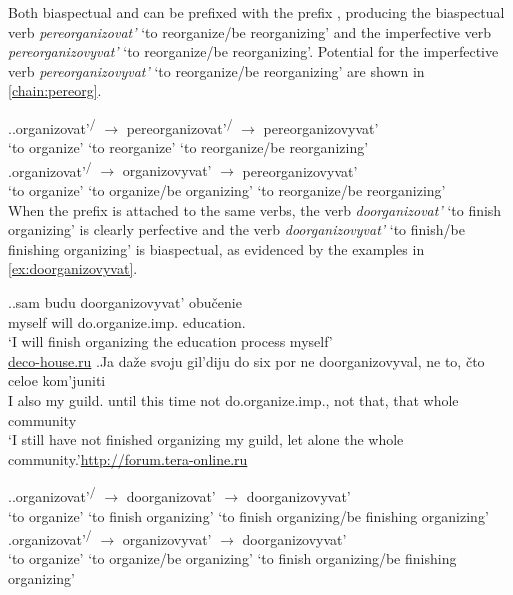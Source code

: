 Both biaspectual and  can be prefixed with the  prefix , producing the biaspectual verb \textit{pereorganizovat'} `to reorganize/be reorganizing' and the imperfective verb \textit{pereorganizovyvat'} `to reorganize/be reorganizing'. Potential  for the imperfective verb \textit{pereorganizovyvat'} `to reorganize/be reorganizing' are shown in \ref{chain:pereorg}. 

\ex.\label{chain:pereorg}\ag.organizovat'\textsuperscript{\PF\slash\IPF} {$\rightarrow$} {pereorganizovat'\textsuperscript{\PF\slash\IPF}} {$\rightarrow$} pereorganizovyvat'\textsuperscript{\IPF}\\
{`to organize'} {} {`to reorganize'} {} {`to reorganize/be reorganizing'}\\
\bg.organizovat'\textsuperscript{\PF\slash\IPF} {$\rightarrow$} {organizovyvat'\textsuperscript{\IPF}} {$\rightarrow$} pereorganizovyvat'\textsuperscript{\IPF}\\
{`to organize'} {} {`to organize/be organizing'} {} {`to reorganize/be reorganizing'}\\

When the  prefix  is attached to the same verbs, the verb \textit{doorganizovat'} `to finish organizing' is clearly perfective and the verb \textit{doorganizovyvat'} `to finish/be finishing organizing' is biaspectual, as evidenced by the examples in \ref{ex:doorganizovyvat}.

\ex.\label{ex:doorganizovyvat}\ag.sam budu doorganizovyvat'\textsuperscript{\IPF} obu\v{c}enie\\
myself will do.organize.imp. education.\\
\trans `I will finish organizing the education process myself'\\\hbox{}\hfill\hbox{\url{deco-house.ru}}
\bg.Ja da\v{z}e svoju gil'diju do six por ne doorganizovyval\textsuperscript{\PF}, ne to, \v{c}to celoe kom'juniti\\
I also my guild. until this time not do.organize.imp., not that, that whole community\\
\trans `I still have not finished organizing my guild, let alone the whole community.'\hbox{}\hfill\hbox{\url{http://forum.tera-online.ru}}

\ex.\label{chain:doorg}\ag.organizovat'\textsuperscript{\PF\slash\IPF} {$\rightarrow$} {doorganizovat'\textsuperscript{\PF}} {$\rightarrow$} doorganizovyvat'\textsuperscript{\IPF}\\
{`to organize'} {} {`to finish organizing'} {} {`to finish organizing/be finishing organizing'}\\
\bg.organizovat'\textsuperscript{\PF\slash\IPF} {$\rightarrow$} {organizovyvat'\textsuperscript{\IPF}} {$\rightarrow$} doorganizovyvat'\textsuperscript{\PF}\\
{`to organize'} {} {`to organize/be organizing'} {} {`to finish organizing/be finishing organizing'}\\

